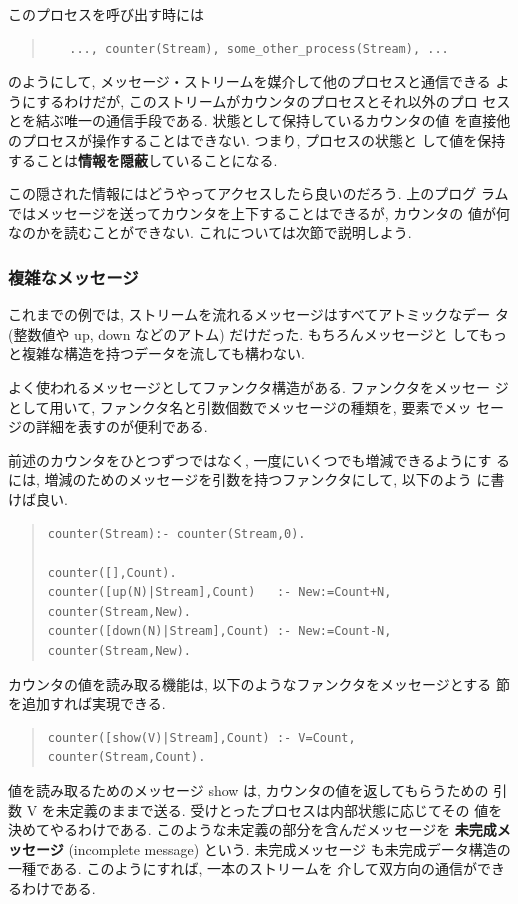 \documentclass[a4,titlepage]{jsreport}
\def\em{\bf\dg}
\let\dg\bf
\newenvironment{program}{\begin{quote}}{\end{quote}}
\begin{document}
このプロセスを呼び出す時には
\begin{program}
\begin{verbatim}
   ..., counter(Stream), some_other_process(Stream), ...
\end{verbatim}
\end{program}
のようにして, メッセージ・ストリームを媒介して他のプロセスと通信できる
ようにするわけだが, このストリームがカウンタのプロセスとそれ以外のプロ
セスとを結ぶ唯一の通信手段である.  状態として保持しているカウンタの値
を直接他のプロセスが操作することはできない.  つまり, プロセスの状態と
して値を保持することは{\em 情報を隠蔽}していることになる.

この隠された情報にはどうやってアクセスしたら良いのだろう.  上のプログ
ラムではメッセージを送ってカウンタを上下することはできるが, カウンタの
値が何なのかを読むことができない.  これについては次節で説明しよう.

\subsubsection{複雑なメッセージ}
これまでの例では, ストリームを流れるメッセージはすべてアトミックなデー
タ (整数値や up, down などのアトム) だけだった.  もちろんメッセージと
してもっと複雑な構造を持つデータを流しても構わない.

よく使われるメッセージとしてファンクタ構造がある.  ファンクタをメッセー
ジとして用いて, ファンクタ名と引数個数でメッセージの種類を, 要素でメッ
セージの詳細を表すのが便利である.

前述のカウンタをひとつずつではなく, 一度にいくつでも増減できるようにす
るには, 増減のためのメッセージを引数を持つファンクタにして, 以下のよう
に書けば良い.
\begin{program}
\begin{Verbatim}[baselinestretch=0.8]
counter(Stream):- counter(Stream,0).

counter([],Count).
counter([up(N)|Stream],Count)   :- New:=Count+N, counter(Stream,New).
counter([down(N)|Stream],Count) :- New:=Count-N, counter(Stream,New).
\end{Verbatim}
\end{program}

カウンタの値を読み取る機能は, 以下のようなファンクタをメッセージとする
節を追加すれば実現できる.
\begin{program}
\begin{verbatim}
counter([show(V)|Stream],Count) :- V=Count, counter(Stream,Count).
\end{verbatim}
\end{program}
値を読み取るためのメッセージ show は, カウンタの値を返してもらうための
引数 V を未定義のままで送る.  受けとったプロセスは内部状態に応じてその
値を決めてやるわけである.  このような未定義の部分を含んだメッセージを
{\em 未完成メッセージ} (incomplete message) という.  未完成メッセージ
も未完成データ構造の一種である.  このようにすれば, 一本のストリームを
介して双方向の通信ができるわけである.
\end{document}
